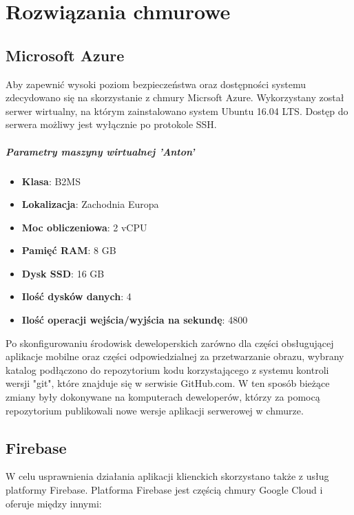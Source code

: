 \chapter{Rozwiązania chmurowe}

\section{Microsoft Azure}

Aby zapewnić wysoki poziom bezpieczeństwa oraz dostępności systemu zdecydowano się na skorzystanie z chmury Micrsoft Azure.
Wykorzystany został serwer wirtualny, na którym zainstalowano system Ubuntu 16.04 LTS. Dostęp do serwera możliwy jest wyłącznie po protokole SSH.

\paragraph{Parametry maszyny wirtualnej 'Anton'}
\begin{itemize}
    \item \textbf{Klasa}: B2MS
    \item \textbf{Lokalizacja}: Zachodnia Europa
    \item \textbf{Moc obliczeniowa}: 2 vCPU
    \item \textbf{Pamięć RAM}: 8 GB
    \item \textbf{Dysk SSD}: 16 GB
    \item \textbf{Ilość dysków danych}: 4
    \item \textbf{Ilość operacji wejścia/wyjścia na sekundę}: 4800
\end{itemize}

Po skonfigurowaniu środowisk deweloperskich zarówno dla części obsługującej aplikacje mobilne oraz części odpowiedzialnej za przetwarzanie obrazu, wybrany katalog podłączono do repozytorium kodu korzystającego z systemu kontroli wersji  "git", które znajduje się w serwisie GitHub.com.
W ten sposób bieżące zmiany były dokonywane na komputerach deweloperów, którzy za pomocą repozytorium publikowali nowe wersje aplikacji serwerowej w chmurze.

\section{Firebase}

W celu usprawnienia działania aplikacji klienckich skorzystano także z usług platformy Firebase. Platforma Firebase jest częścią chmury Google Cloud i oferuje między innymi:

